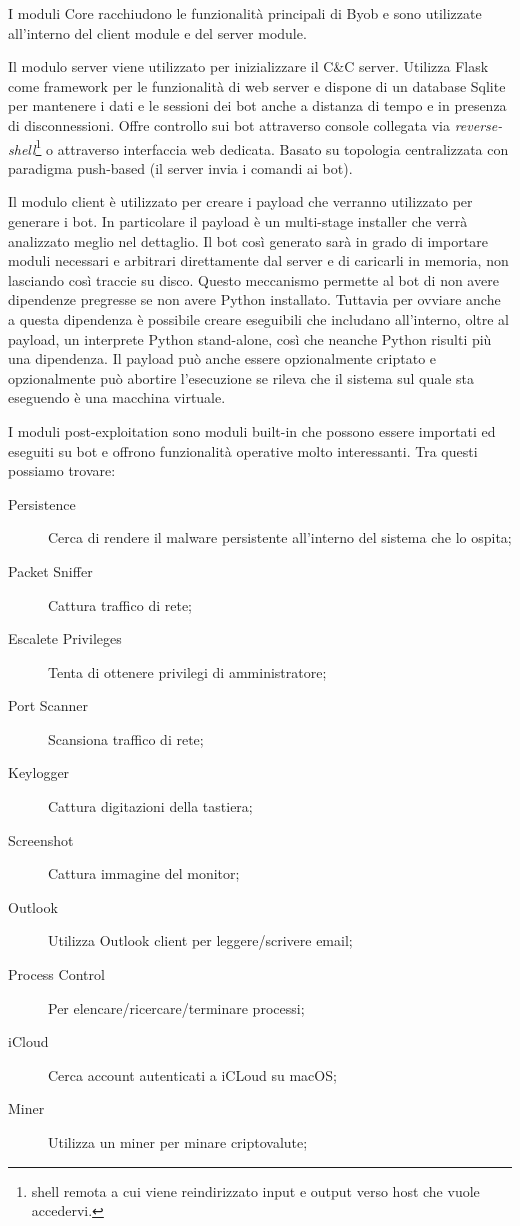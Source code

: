 I moduli Core racchiudono le funzionalità principali di Byob e sono utilizzate all'interno del client module e del server module.  

Il modulo server viene utilizzato per inizializzare il C\&C server. Utilizza Flask \cite{flask} come framework per le funzionalità di web server e  dispone di un database Sqlite \cite{sqlite} per mantenere i dati e le sessioni dei bot anche a distanza di tempo e in presenza di disconnessioni. Offre controllo sui bot attraverso console collegata via \textit{reverse-shell}\footnote{shell remota a cui viene reindirizzato input e output verso host che vuole accedervi.} o attraverso interfaccia web dedicata. Basato su topologia centralizzata con paradigma push-based (il server invia i comandi ai bot).

Il modulo client è utilizzato per creare i payload che verranno utilizzato per generare i bot. In particolare il payload è un multi-stage installer che verrà analizzato meglio nel dettaglio.  Il bot così generato sarà in grado di importare moduli necessari e arbitrari direttamente dal server e di caricarli in memoria, non lasciando così traccie su disco. Questo meccanismo permette al bot di non avere dipendenze pregresse se non avere Python installato. Tuttavia per ovviare anche a questa dipendenza è possibile creare eseguibili che includano all'interno, oltre al payload, un interprete Python stand-alone, così che neanche Python risulti più una dipendenza.  Il payload può anche essere opzionalmente criptato e opzionalmente può abortire l'esecuzione se rileva che il sistema sul quale sta eseguendo è una macchina virtuale.

I moduli post-exploitation sono moduli built-in che possono essere importati ed eseguiti su bot e offrono funzionalità operative molto interessanti.
Tra questi possiamo trovare:

\begin{description}
    \item [Persistence] Cerca di rendere il malware persistente all'interno del sistema che lo ospita;
    \item [Packet Sniffer] Cattura traffico di rete;
    \item [Escalete Privileges] Tenta di ottenere privilegi di amministratore;
    \item [Port Scanner] Scansiona traffico di rete;
    \item [Keylogger] Cattura digitazioni della tastiera;
    \item [Screenshot] Cattura immagine del monitor;
    \item [Outlook] Utilizza Outlook client per leggere/scrivere email;
    \item [Process Control] Per elencare/ricercare/terminare processi;
    \item [iCloud] Cerca account autenticati a iCLoud su macOS;
    \item [Miner] Utilizza un miner per minare criptovalute;
\end{description}

